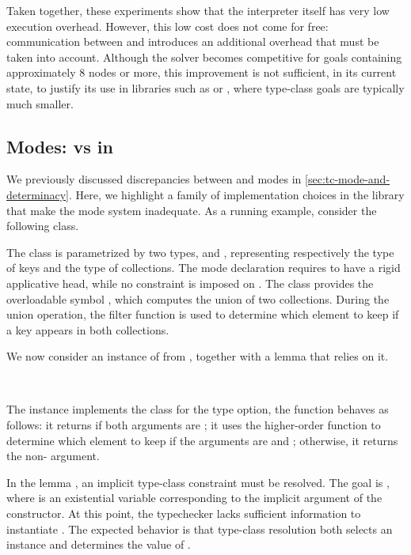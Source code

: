 Taken together, these experiments show that the \elpi interpreter itself has
very low execution overhead. However, this low cost does not come for free:
communication between \rocq and \elpi introduces an additional overhead that
must be taken into account. Although the \elpi solver becomes competitive for
goals containing approximately $8$ nodes or more, this improvement is not
sufficient, in its current state, to justify its use in libraries such as
\stdpp or \tlc, where type-class goals are typically much smaller.

\subsection{Modes: \elpi vs \rocq in \stdpp}
\label{sec:modes-stdpp}

We previously discussed discrepancies between \elpi and \rocq modes in
\cref{sec:tc-mode-and-determinacy}. Here, we highlight a family of
implementation choices in the \stdpp library that make the \elpi mode
system inadequate. As a running example, consider the following class.



The class is parametrized by two types,  and , representing
respectively the type of keys and the type of collections. The mode
declaration requires  to have a rigid applicative head, while no
constraint is imposed on . The class provides the overloadable
symbol , which computes the union of two collections. During
the union operation, the filter function is used to determine which
element to keep if a key appears in both collections.

We now consider an instance of  from \stdpp, together with a
lemma that relies on it.

\mvspace{}
\noindent
\\

\mvspace{}

The  instance implements the class  for the type
option, the  function behaves as follows: it returns  if
both arguments are ; it uses the higher-order function
to determine which element to keep if the arguments are
 and ; otherwise, it returns the non-
argument.

In the lemma , an implicit type-class constraint must be resolved. The
goal is , where  is an existential variable
corresponding to the implicit argument of the  constructor. At
this point, the typechecker lacks sufficient information to instantiate
. The expected behavior is that type-class resolution both
selects an instance and determines the value of .

